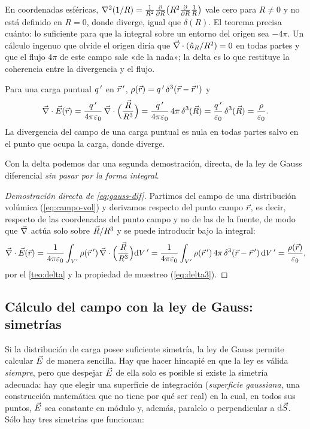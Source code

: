 \begin{observacion}\label{obs:delta-div}
En coordenadas esféricas, $\nabla^{2}(1/R)=\frac{1}{R^{2}}\frac{\partial }{\partial R}\bigl(R^{2}\frac{\partial }{\partial R}\frac{1}{R}\bigr)$ vale cero para $R\neq0$ y no está definido en
$R=0$, donde diverge, igual que $\delta(R)$. El teorema precisa cuánto: lo suficiente para que la integral sobre un entorno
del origen sea $-4\pi$. Un cálculo ingenuo que olvide el origen diría que $\vec{\nabla}\cdot(\hat{u}_{R}/R^{2})=0$ en todas partes y
que el flujo $4\pi$ de este campo sale «de la nada»; la delta es lo que restituye la coherencia entre la divergencia y el flujo.
\end{observacion}

\begin{corolario}\label{cor:gauss-puntual}
Para una carga puntual $q\,'$ en $\vec{r}\,'$, $\rho(\vec{r})=q\,'\,\delta^{3}(\vec{r}-\vec{r}\,')$ y
\[
  \vec{\nabla}\cdot\vec{E}(\vec{r})=\frac{q\,'}{4\pi\varepsilon_{0}}\,\vec{\nabla}\cdot\Bigl(\frac{\vec{R}}{R^{3}}\Bigr)=\frac{q\,'}{4\pi\varepsilon_{0}}\,4\pi\,\delta^{3}(\vec{R})
  =\frac{q\,'}{\varepsilon_{0}}\,\delta^{3}(\vec{R})=\frac{\rho}{\varepsilon_{0}}.
\]
La divergencia del campo de una carga puntual es nula en todas partes salvo en el punto que ocupa la carga, donde diverge.
\end{corolario}

Con la delta podemos dar una segunda demostración, directa, de la ley de Gauss diferencial \emph{sin pasar por la forma integral}.

\begin{proof}[Demostración directa de \cref{eq:gauss-dif}]
Partimos del campo de una distribución volúmica (\cref{eq:campo-vol}) y derivamos respecto del punto campo $\vec{r}$, es decir, respecto de las
coordenadas del punto campo y no de las de la fuente, de modo que $\vec{\nabla}$ actúa solo sobre $\vec{R}/R^{3}$ y se puede introducir bajo
la integral:
\[
  \vec{\nabla}\cdot\vec{E}(\vec{r})=\frac{1}{4\pi\varepsilon_{0}}\int_{V'}\rho(\vec{r}\,')\,\vec{\nabla}\cdot\Bigl(\frac{\vec{R}}{R^{3}}\Bigr)\mathrm{d} V\,'
  =\frac{1}{4\pi\varepsilon_{0}}\int_{V'}\rho(\vec{r}\,')\,4\pi\,\delta^{3}(\vec{r}-\vec{r}\,')\,\mathrm{d} V\,'=\frac{\rho(\vec{r})}{\varepsilon_{0}},
\]
por el \cref{teo:delta} y la propiedad de muestreo (\cref{eq:delta3}).
\end{proof}

\subsection{Cálculo del campo con la ley de Gauss: simetrías}\label{sec:gauss-simetria}
Si la distribución de carga posee suficiente simetría, la ley de Gauss permite calcular $\vec{E}$ de manera sencilla. Hay que hacer
hincapié en que la ley es válida \emph{siempre}, pero que despejar $\vec{E}$ de ella solo es posible si existe la simetría adecuada:
hay que elegir una superficie de integración (\emph{superficie gaussiana}, una construcción matemática que no tiene por qué ser real)
en la cual, en todos sus puntos, $\vec{E}$ sea constante en módulo y, además, paralelo o perpendicular a $\mathrm{d}\vec{S}$. Sólo hay tres
simetrías que funcionan:

